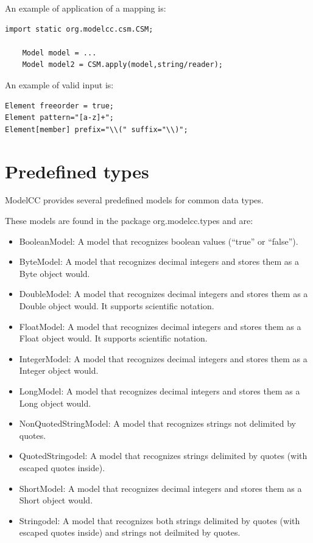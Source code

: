 \documentclass[a4paper,twoside,onecolumn]{article}
\begin{document}
An example of application of a mapping is:

\begin{verbatim}
import static org.modelcc.csm.CSM;

    Model model = ...
    Model model2 = CSM.apply(model,string/reader);
\end{verbatim}

An example of valid input is:

\begin{verbatim}
Element freeorder = true;
Element pattern="[a-z]+";
Element[member] prefix="\\(" suffix="\\)";
\end{verbatim}

\section{Predefined types} \label{sec:predefinedtypes}

ModelCC provides several predefined models for common data types.

These models are found in the package org.modelcc.types and are:

\begin{itemize}
\item BooleanModel: A model that recognizes boolean values (``true'' or ``false'').
\item ByteModel: A model that recognizes decimal integers and stores them as a Byte object would.
\item DoubleModel: A model that recognizes decimal integers and stores them as a Double object would. It supports scientific notation.
\item FloatModel: A model that recognizes decimal integers and stores them as a Float object would. It supports scientific notation.
\item IntegerModel: A model that recognizes decimal integers and stores them as a Integer object would.
\item LongModel: A model that recognizes decimal integers and stores them as a Long object would.
\item NonQuotedStringModel: A model that recognizes strings not delimited by quotes.
\item QuotedStringodel: A model that recognizes strings delimited by quotes (with escaped quotes inside).
\item ShortModel: A model that recognizes decimal integers and stores them as a Short object would.
\item Stringodel: A model that recognizes both strings delimited by quotes (with escaped quotes inside) and strings not deilmited by quotes.
\end{itemize}
\end{document}
